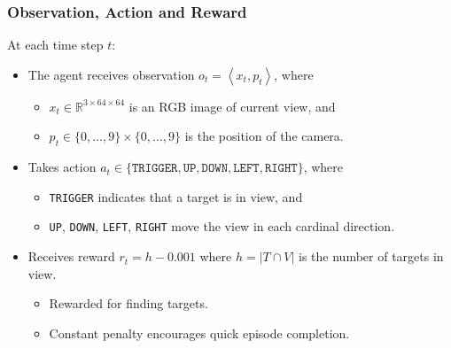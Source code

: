 \begin{frame}
    \frametitle{Observation, Action and Reward}

    At each time step \(t\):

    \begin{itemize}
        \item The agent receives observation \(o_t = \left\langle x_t, p_t \right\rangle\), where
        \begin{itemize}
            \item \(x_t \in \mathbb{R}^{3 \times 64 \times 64}\) is an RGB image of current view, and
            \item \(p_t \in \{0, \dots, 9\} \times \{0, \dots, 9\}\) is the position of the camera.
        \end{itemize}
        \item Takes action \(a_t \in \{\texttt{TRIGGER}, \texttt{UP}, \texttt{DOWN}, \texttt{LEFT}, \texttt{RIGHT}\}\), where
        \begin{itemize}
            \item \texttt{TRIGGER} indicates that a target is in view, and
            \item \texttt{UP}, \texttt{DOWN}, \texttt{LEFT}, \texttt{RIGHT} move the view in each cardinal direction.
        \end{itemize}
        \item Receives reward \(r_t = h - 0.001\) where \(h = \left\vert T \cap V \right\vert\) is the number of targets in view.
        \begin{itemize}
            \item Rewarded for finding targets.
            \item Constant penalty encourages quick episode completion.
        \end{itemize}
    \end{itemize}
\end{frame}

